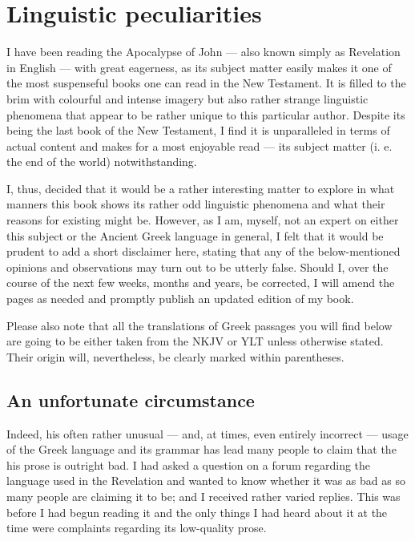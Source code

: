 \chapter*{Linguistic peculiarities}

I have been reading the Apocalypse of John — also known simply as Revelation in English — with great eagerness, as its subject matter easily makes it one of the most suspenseful books one can read in the New Testament. It is filled to the brim with colourful and intense imagery but also rather strange linguistic phenomena that appear to be rather unique to this particular author. Despite its being the last book of the New Testament, I find it is unparalleled in terms of actual content and makes for a most enjoyable read — its subject matter (i. e. the end of the world) notwithstanding.

I, thus, decided that it would be a rather interesting matter to explore in what manners this book shows its rather odd linguistic phenomena and what their reasons for existing might be. However, as I am, myself, not an expert on either this subject or the Ancient Greek language in general, I felt that it would be prudent to add a short disclaimer here, stating that any of the below-mentioned opinions and observations may turn out to be utterly false. Should I, over the course of the next few weeks, months and years, be corrected, I will amend the pages as needed and promptly publish an updated edition of my book. 

Please also note that all the translations of Greek passages you will find below are going to be either taken from the NKJV or YLT unless otherwise stated. Their origin will, nevertheless, be clearly marked within parentheses.

\section*{An unfortunate circumstance}
  
Indeed, his often rather unusual — and, at times, even entirely incorrect — usage of the Greek language and its grammar has lead many people to claim that the his prose is outright bad. I had asked a question on a forum regarding the language used in the Revelation and wanted to know whether it was as bad as so many people are claiming it to be; and I received rather varied replies. This was before I had begun reading it and the only things I had heard about it at the time were complaints regarding its low-quality prose.


